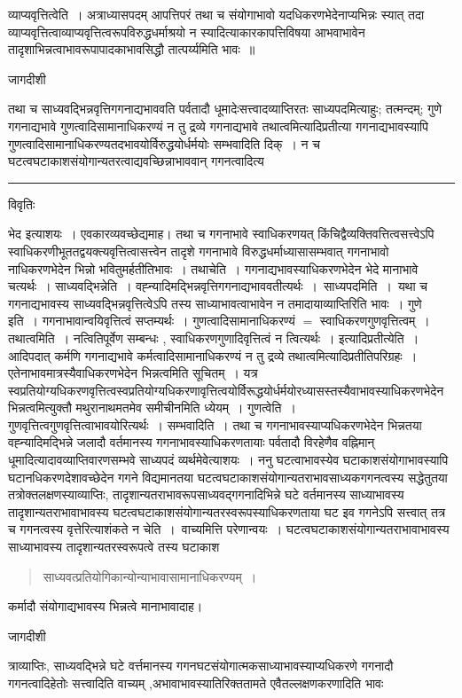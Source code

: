 \documentclass[10pt, openany]{book}
\begin{document}
{व्याप्यवृत्तित्वेति~। अत्राध्यासपदम् आपत्तिपरं तथा च संयोगाभावो यदधिकरणभेदेनाप्यभिन्नः स्यात् तदा व्याप्यवृत्तित्वाव्याप्यवृत्तित्वरूपविरुद्धधर्माश्रयो न स्यादित्याकारकापत्तिविषया आभवाभावेन तादृशाभिन्नत्वाभावरूपापादकाभावसिद्धौ तात्पर्य्यमिति भावः~॥
\newpage
\begin{center} जागदीशी \end{center}
{\la तथा च साध्यवद्भिन्नवृत्तिगगनाद्यभाववति पर्वतादौ धूमादेःसत्त्वादव्याप्तिरतः
साध्यपदमित्याहुः; तत्मन्दम्; गुणे गगनाद्यभावे गुणत्वादिसामानाधिकरण्यं न तु द्रव्ये गगनाद्यभावे तथात्वमित्यादिप्रतीत्या गगनाद्यभावस्यापि
गुणत्वादिसामानाधिकरण्यतदभावयोर्विरुद्धयोर्धर्मयोः सम्भवादिति दिक्~। न च घटत्वघटाकाशसंयोगान्यतरत्वाद्यवच्छिन्नाभाववान् गगनत्वादित्य}\\
\hrule
\begin{center}     विवृतिः \end{center}
भेद इत्याशयः~। एवकारव्यवच्छेद्यमाह। तथा च गगनाभावे स्वाधिकरणयत् किंचिद्वैव्यक्तिवत्तित्वसत्त्वेऽपि
स्वाधिकरणीभूततद्वयक्त्यवृत्तित्वासत्त्वेन तादृशे  गगनाभावे विरुद्धधर्माध्यासासम्भवात् गगनाभावो नाधिकरणभेदेन भिन्नो भवितुमर्हतीतिभावः~। तथाचेति~। गगनाद्यभावस्याधिकरणभेदेन भेदे मानाभावे चत्यर्थः~। साध्यवद्भिन्नेति~। वह्न्यादिमद्भिन्नवृत्तिगगनाद्यभाववतीत्यर्थः~।~{\la साध्यपदमिति~।}~यथा च गगनाद्यभावस्य साध्यवद्भिन्नवृत्तित्वेऽपि तस्य साध्याभावत्वाभावेन न तमादायाव्याप्तिरिति भावः~। गुणे इति~। गगनाभावान्वयिवृत्तित्वं सप्तम्यर्थः~। गुणत्वादिसामानाधिकरण्यं $=$ स्वाधिकरणगुणवृत्तित्वम्~। तथात्वमिति~। नत्वितिपूर्वेण सम्बन्धः , स्वाधिकरणगुणादिवृत्तित्वं न त्वित्यर्थः~। इत्यादिप्रतीत्येति~। आदिपदात् कर्मणि गगनाद्यभावे कर्मत्वादिसामानाधिकरण्यं न तु द्रव्ये तथात्वमित्यादिप्रतीतिपरिग्रहः~। एतेनाभावमात्रस्यैवाधिकरणभेदेन भिन्नत्वमिति सूचितम्~। यत्र
स्वप्रतियोग्यधिकरणवृत्तित्वस्वप्रतियोग्यधिकरणावृत्तित्वयोर्विरूद्धयोर्धर्मयोरध्यासस्तस्यैवाभावस्याधिकरणभेदेन भिन्नत्वमित्युक्तौ मथुरानाथमतमेव समीचीनमिति ध्येयम्~। गुणत्वेति~। गुणवृत्तित्वगुणवृत्तित्वाभावयोरित्यर्थः~। सम्भवादिति~। तथा च गगनाभावस्याप्यधिकरणभेदेन भिन्नतया वह्न्यादिमद्भिन्ने जलादौ वर्तमानस्य गगनाभावस्याधिकरणतायाः पर्वतादौ विरहेणैव वह्निमान् धूमादित्यादावव्याप्तिवारणसम्भवे साध्यपदं व्यर्थमेवेत्याशयः~। ननु घटत्वाभावस्येव घटाकाशसंयोगाभावस्यापि घटानधिकरणदेशावच्छेदेन गगने विद्यमानतया घटत्वघटाकाशसंयोगान्यतराभावसाध्यकगगनत्वस्य सद्धेतुतया तत्रोक्तलक्षणस्याव्याप्तिः,
तादृशान्यतराभावरूपसाध्यवद्गगनादिभिन्ने घटे वर्तमानस्य साध्याभावस्य तादृशान्यतराभावाभावस्य घटत्वघटाकाशसंयोगान्यतरस्वरूपस्याधिकरणताया घट इव गगनेऽपि सत्त्वात् तत्र च गगनत्वस्य वृत्तेरित्याशंकते {\la न चेति~।}~वाच्यमित्ति परेणान्वयः~। घटत्वघटाकाशसंयोगान्यतराभावाभावस्य साध्याभावस्य तादृशान्यतरस्वरूपत्वे तस्य घटाकाश
\newpage
\begin{quote}
\vpc
साध्यवत्प्रतियोगिकान्योन्याभावासामानाधिकरण्यम्~।~   
\end{quote}
{\la
कर्मादौ संयोगाद्यभावस्य भिन्नत्वे मानाभावादाह।}
\begin{center} जागदीशी \end{center}
{\la त्राव्याप्तिः, साध्यवद्भिन्ने घटे वर्त्तमानस्य गगनघटसंयोगात्मकसाध्याभावस्याप्यधिकरणे गगनादौ गगनत्वादिहेतोः सत्त्वादिति वाच्यम् ,अभावाभावस्यातिरिक्ततामते एवैतल्लक्षणकरणादिति भावः\\

}}
\end{document}
